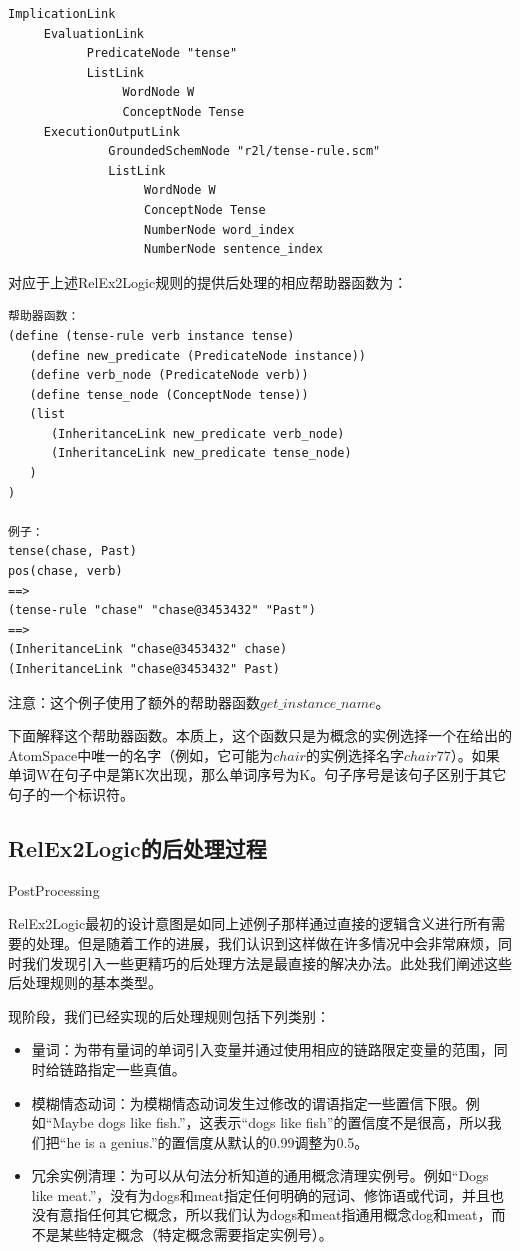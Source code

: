 \begin{verbatim}
ImplicationLink
     EvaluationLink
           PredicateNode "tense"
           ListLink
                WordNode W
                ConceptNode Tense
     ExecutionOutputLink
              GroundedSchemNode "r2l/tense-rule.scm"
              ListLink
                   WordNode W
                   ConceptNode Tense
                   NumberNode word_index
                   NumberNode sentence_index

\end{verbatim}

对应于上述RelEx2Logic规则的提供后处理的相应帮助器函数为：

\begin{verbatim}
帮助器函数：
(define (tense-rule verb instance tense)
   (define new_predicate (PredicateNode instance))
   (define verb_node (PredicateNode verb)) 
   (define tense_node (ConceptNode tense))
   (list
      (InheritanceLink new_predicate verb_node)
      (InheritanceLink new_predicate tense_node)
   )
)

例子：
tense(chase, Past)
pos(chase, verb)
==>
(tense-rule "chase" "chase@3453432" "Past")
==>
(InheritanceLink "chase@3453432" chase)
(InheritanceLink "chase@3453432" Past)

\end{verbatim}

注意：这个例子使用了额外的帮助器函数$get\_instance\_name$。

下面解释这个帮助器函数。本质上，这个函数只是为概念的实例选择一个在给出的AtomSpace中唯一的名字（例如，它可能为$chair$的实例选择名字$chair77$）。如果单词W在句子中是第K次出现，那么单词序号为K。句子序号是该句子区别于其它句子的一个标识符。

\subsection{RelEx2Logic的后处理过程}{PostProcessing}

RelEx2Logic最初的设计意图是如同上述例子那样通过直接的逻辑含义进行所有需要的处理。但是随着工作的进展，我们认识到这样做在许多情况中会非常麻烦，同时我们发现引入一些更精巧的后处理方法是最直接的解决办法。此处我们阐述这些后处理规则的基本类型。

现阶段，我们已经实现的后处理规则包括下列类别：

\begin{itemize}
\item 量词：为带有量词的单词引入变量并通过使用相应的链路限定变量的范围，同时给链路指定一些真值。
\item 模糊情态动词：为模糊情态动词发生过修改的谓语指定一些置信下限。例如“Maybe dogs like fish.”，这表示“dogs like fish”的置信度不是很高，所以我们把“he is a genius.”的置信度从默认的0.99调整为0.5。
\item 冗余实例清理：为可以从句法分析知道的通用概念清理实例号。例如“Dogs like meat.”，没有为dogs和meat指定任何明确的冠词、修饰语或代词，并且也没有意指任何其它概念，所以我们认为dogs和meat指通用概念dog和meat，而不是某些特定概念（特定概念需要指定实例号）。
\end{itemize}

